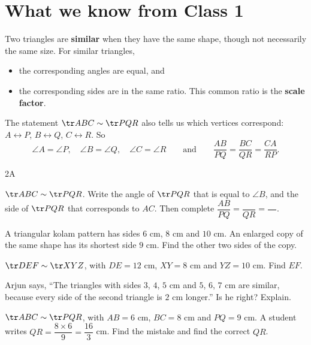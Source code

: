 \section{What we know from Class 1}

Two triangles are \textbf{similar} when they have the same shape, though not necessarily the same size. For similar triangles,
\begin{itemize}[leftmargin=1.8em,itemsep=1pt]
  \item the corresponding angles are equal, and
  \item the corresponding sides are in the same ratio. This common ratio is the \textbf{scale factor}.
\end{itemize}

The statement $\tr ABC\sim\tr PQR$ also tells us which vertices correspond: $A\leftrightarrow P$, $B\leftrightarrow Q$, $C\leftrightarrow R$. So
\[
\angle A=\angle P,\quad \angle B=\angle Q,\quad \angle C=\angle R
\qquad\text{and}\qquad
\dfrac{AB}{PQ}=\dfrac{BC}{QR}=\dfrac{CA}{RP}.
\]

\begin{exercise}{2A}
  \item $\tr ABC\sim\tr PQR$. Write the angle of $\tr PQR$ that is equal to $\angle B$, and the side of $\tr PQR$ that corresponds to $AC$. Then complete $\dfrac{AB}{PQ}=\dfrac{\quad}{QR}=\dfrac{\quad}{\quad}$.
  \item A triangular kolam pattern has sides $6$ cm, $8$ cm and $10$ cm. An enlarged copy of the same shape has its shortest side $9$ cm. Find the other two sides of the copy.
  \item $\tr DEF\sim\tr XYZ$, with $DE=12$ cm, $XY=8$ cm and $YZ=10$ cm. Find $EF$.
  \item Arjun says, ``The triangles with sides $3$, $4$, $5$ cm and $5$, $6$, $7$ cm are similar, because every side of the second triangle is $2$ cm longer.'' Is he right? Explain.
  \item $\tr ABC\sim\tr PQR$, with $AB=6$ cm, $BC=8$ cm and $PQ=9$ cm. A student writes
  $QR=\dfrac{8\times6}{9}=\dfrac{16}{3}$ cm. Find the mistake and find the correct $QR$.
\end{exercise}

